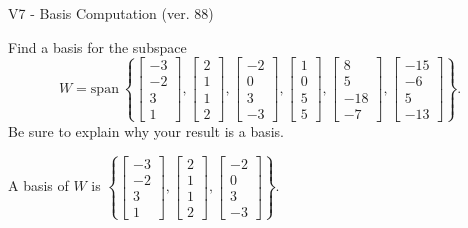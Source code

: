 \begin{exercise}
  \begin{exerciseTitle}V7 - Basis Computation (ver. 88)\end{exerciseTitle}
  \begin{exerciseStatement}
    Find a basis for the subspace 
\[W=\mathrm{span}\ \left\{\left[\begin{array}{r}
-3 \\
-2 \\
3 \\
1
\end{array}\right] , \left[\begin{array}{r}
2 \\
1 \\
1 \\
2
\end{array}\right] , \left[\begin{array}{r}
-2 \\
0 \\
3 \\
-3
\end{array}\right] , \left[\begin{array}{r}
1 \\
0 \\
5 \\
5
\end{array}\right] , \left[\begin{array}{r}
8 \\
5 \\
-18 \\
-7
\end{array}\right] , \left[\begin{array}{r}
-15 \\
-6 \\
5 \\
-13
\end{array}\right]\right\}.\]
 Be sure to explain why your result is a basis.


  \end{exerciseStatement}
  \begin{exerciseAnswer}
   A basis of \(W\) is  \(\left\{\left[\begin{array}{r}
-3 \\
-2 \\
3 \\
1
\end{array}\right] , \left[\begin{array}{r}
2 \\
1 \\
1 \\
2
\end{array}\right] , \left[\begin{array}{r}
-2 \\
0 \\
3 \\
-3
\end{array}\right]\right\}\).
  


  \end{exerciseAnswer}
\end{exercise}